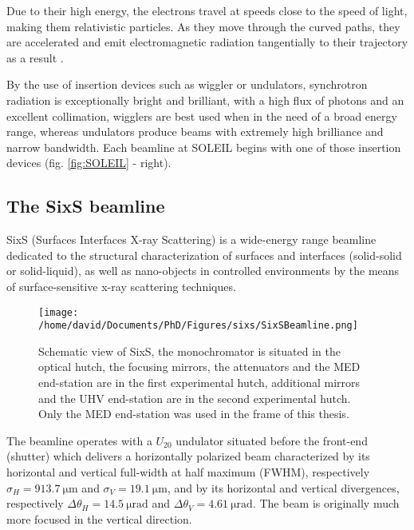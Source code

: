Due to their high energy, the electrons travel at speeds close to the speed of light, making them relativistic particles.
As they move through the curved paths, they are accelerated and emit electromagnetic radiation tangentially to their trajectory as a result \parencite{Willmott, NielsenMcMorrow}.

By the use of insertion devices such as wiggler or undulators, synchrotron radiation is exceptionally bright and brilliant, with a high flux of photons and an excellent collimation, wigglers are best used when in the need of a broad energy range, whereas undulators produce beams with extremely high brilliance and narrow bandwidth.
Each beamline at SOLEIL begins with one of those insertion devices (fig. \ref{fig:SOLEIL} - right).

\subsection{The SixS beamline}

SixS (Surfaces Interfaces X-ray Scattering) is a wide-energy range beamline dedicated to the structural characterization of surfaces and interfaces (solid-solid or solid-liquid), as well as nano-objects in controlled environments by the means of surface-sensitive x-ray scattering techniques.

\begin{figure}[!htb]
    \centering
    \texttt{[image: /home/david/Documents/PhD/Figures/sixs/SixSBeamline.png]}
    \caption{
		Schematic view of SixS, the monochromator is situated in the optical hutch, the focusing mirrors, the attenuators and the MED end-station are in the first experimental hutch, additional mirrors and the UHV end-station are in the second experimental hutch.
		Only the MED end-station was used in the frame of this thesis.
    }
    \label{fig:SixSBeamline}
\end{figure}

The beamline operates with a $U_{20}$ undulator situated before the front-end (shutter) which delivers a horizontally polarized beam characterized by its horizontal and vertical full-width at half maximum (FWHM), respectively $\sigma_H = \qty{913.7}{\um}$ and $\sigma_V = \qty{19.1}{\um}$, and by its horizontal and vertical divergences, respectively $\Delta\theta_H = \qty{14.5}{\micro\radian}$ and $\Delta\theta_V = \qty{4.61}{\micro\radian}$.
The beam is originally much more focused in the vertical direction.

